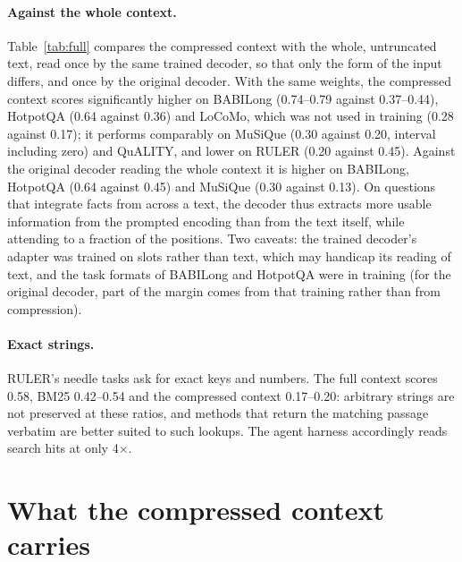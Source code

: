 \documentclass[11pt]{article}
\begin{document}
\paragraph{Against the whole context.}
Table~\ref{tab:full} compares the compressed context with the whole, untruncated text, read once by the
same trained decoder, so that only the form of the input differs, and once by the original decoder.
With the same weights, the compressed context scores significantly higher on BABILong (0.74--0.79
against 0.37--0.44), HotpotQA (0.64 against 0.36) and LoCoMo, which was not used in training (0.28
against 0.17); it performs comparably on MuSiQue (0.30 against 0.20, interval including zero) and
QuALITY, and lower on RULER (0.20 against 0.45). Against the original decoder reading the whole
context it is higher on BABILong, HotpotQA (0.64 against 0.45) and MuSiQue (0.30 against 0.13).
On questions that integrate facts from across a text, the decoder thus extracts more usable
information from the prompted encoding than from the text itself, while attending to a fraction of the
positions. Two caveats: the
trained decoder's adapter was trained on slots rather than text, which may handicap its reading of
text, and the task formats of BABILong and HotpotQA were in training (for the original decoder, part
of the margin comes from that training rather than from compression).

\begin{table}[!ht]
\centering
\small
\resizebox{\linewidth}{!}{}
\caption{The compressed context at each benchmark's smallest budget against the whole, untruncated
context read by the same trained decoder and by the original decoder (benchmarks whose contexts fit
the 32k-token limit of the full-context runs). Differences: mean paired difference with 95\%
bootstrap interval; bold where it excludes zero.}
\label{tab:full}
\end{table}

\paragraph{Exact strings.}
RULER's needle tasks ask for exact keys and numbers. The full context scores 0.58, BM25 0.42--0.54
and the compressed context 0.17--0.20: arbitrary strings are not preserved at these ratios, and
methods that return the matching passage verbatim are better suited to such lookups. The agent harness accordingly reads
search hits at only 4$\times$.


\section{What the compressed context carries}
\label{sec:vectors}
\end{document}
